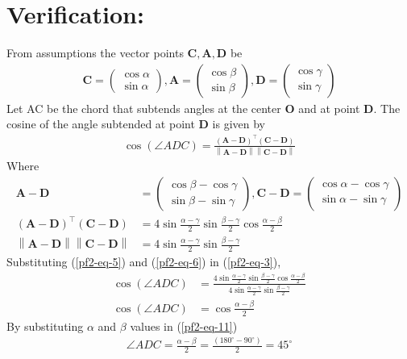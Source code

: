 \documentclass[12pt]{article}
\providecommand{\norm}[1]{\left\lVert#1\right\rVert}
\newcommand{\myvec}[1]{\ensuremath{\begin{pmatrix}#1\end{pmatrix}}}
\let\vec\mathbf
\begin{document}
\section*{Verification:}
From assumptions the vector points $\vec{C,A,D}$ be
\begin{align}
	\vec{C} = \myvec{\cos\alpha\\\sin\alpha},
	\vec{A} = \myvec{\cos\beta\\\sin\beta},
	\vec{D} = \myvec{\cos\gamma\\\sin\gamma}
\end{align}
Let AC be the chord that subtends angles at the center $\vec{O}$ and at point $\vec{D}$. The cosine of the angle subtended at point $\vec{D}$ is given by
\begin{align}
	\cos(\angle ADC) = \frac{\vec{(A-D)^\top(C-D)}}{\norm{\vec{A-D}}\norm{\vec{C-D}}}
	\label{pf2-eq-3}
\end{align}
Where
 \begin{align}
	 \vec{A-D}& = \myvec{\cos\beta - \cos\gamma\\\sin\beta - \sin\gamma},
	 \vec{C-D} = \myvec{\cos\alpha - \cos\gamma\\\sin\alpha - \sin\gamma}\\
	 \label{pf2-eq-5} \vec{(A-D)^\top(C-D)}&= 4\sin\frac{\alpha-\gamma}2\sin\frac{\beta-\gamma}2\cos\frac{\alpha-\beta}2\\
	 \norm{\vec{A-D}}\norm{\vec{C-D}}& = 4 \sin\frac{\alpha-\gamma}2\sin\frac{\beta-\gamma}2
	\label{pf2-eq-6}
\end{align}
Substituting (\ref{pf2-eq-5}) and (\ref{pf2-eq-6}) in (\ref{pf2-eq-3}),
\begin{align}
	\cos(\angle ADC) &= \frac{4\sin\frac{\alpha-\gamma}{2}\sin\frac{\beta-\gamma}{2}\cos\frac{\alpha-\beta}{2}}{4 \sin\frac{\alpha-\gamma}2\sin\frac{\beta-\gamma}2}\\
	\cos(\angle ADC) &= \cos\frac{\alpha-\beta}{2}
	\label{pf2-eq-11}
\end{align}
By substituting $\alpha$ and $\beta$ values in (\ref{pf2-eq-11})
\begin{align}
\angle ADC = \frac{\alpha-\beta}{2}=\frac{(180^\circ - 90^\circ )}{2}=45^\circ
\end{align}
\end{document}
